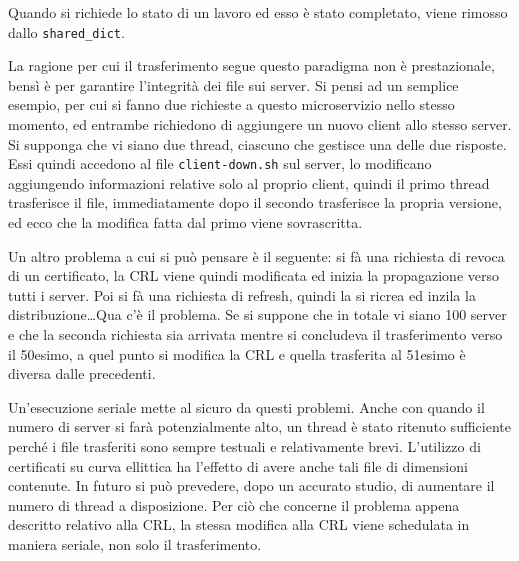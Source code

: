Quando si richiede lo stato di un lavoro ed esso è stato completato, viene rimosso dallo \texttt{shared\_dict}.

La ragione per cui il trasferimento segue questo paradigma non è prestazionale, bensì è per
garantire l'integrità dei file sui server.
Si pensi ad un semplice esempio, per cui si fanno due richieste a questo microservizio nello stesso
momento, ed entrambe richiedono di aggiungere un nuovo client allo stesso server.
Si supponga che vi siano due thread, ciascuno che gestisce una delle due risposte. Essi quindi
accedono al file \texttt{client-down.sh} sul server, lo modificano aggiungendo informazioni
relative solo al proprio client, quindi il primo thread trasferisce il file, immediatamente dopo
il secondo trasferisce la propria versione, ed ecco che la modifica fatta dal primo viene
sovrascritta.

Un altro problema a cui si può pensare è il seguente: si fà una richiesta di revoca di un certificato,
la CRL viene quindi modificata ed inizia la propagazione verso tutti i server.
Poi si fà una richiesta di refresh, quindi la si ricrea ed inzila la distribuzione\ldots Qua c'è il
problema. Se si suppone che in totale vi siano 100 server e che la seconda richiesta sia arrivata
mentre si concludeva il trasferimento verso il 50esimo, a quel punto si modifica la CRL
e quella trasferita al 51esimo è diversa dalle precedenti.

Un'esecuzione seriale mette al sicuro da questi problemi. Anche con quando il numero di server
si farà potenzialmente alto, un thread è stato ritenuto sufficiente perché i file trasferiti
sono sempre testuali e relativamente brevi. L'utilizzo di certificati su curva ellittica
ha l'effetto di avere anche tali file di dimensioni contenute. In futuro si può prevedere,
dopo un accurato studio, di aumentare il numero di thread a disposizione.
Per ciò che concerne il problema appena descritto relativo alla CRL, la stessa modifica alla CRL
viene schedulata in maniera seriale, non solo il trasferimento.


